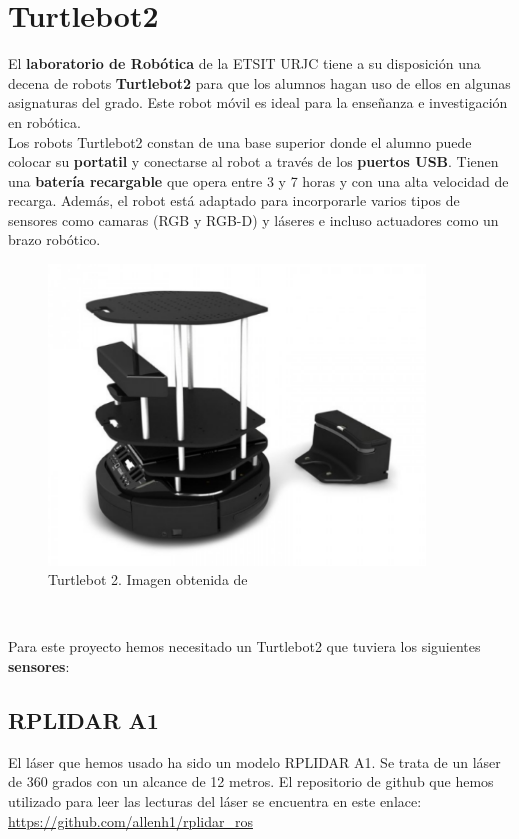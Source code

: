 \section{Turtlebot2}
\label{sec:turtlebot2}

El \textbf{laboratorio de Robótica} de la ETSIT URJC tiene a su disposición una decena de robots \textbf{Turtlebot2} para que los alumnos hagan uso de ellos en algunas asignaturas del grado. Este robot móvil es ideal para la enseñanza e investigación en robótica.\\

Los robots Turtlebot2 constan de una base superior donde el alumno puede colocar su \textbf{portatil} y conectarse al robot a través de los \textbf{puertos USB}. Tienen una \textbf{batería recargable} que opera entre 3 y 7 horas y con una alta velocidad de recarga. Además, el robot está adaptado para incorporarle varios tipos de sensores como camaras (RGB y RGB-D) y láseres e incluso actuadores como un brazo robótico.\\

\begin{figure} [H]
  \begin{center}
    \includegraphics[width=10cm]{imagenes/turtlebot2-real.png}
  \end{center}
  \caption[Turtlebot 2]{Turtlebot 2. Imagen obtenida de \cite{turtlebot2}}
  \label{fig:turtlebot2_real}
\end{figure}\

Para este proyecto hemos necesitado un Turtlebot2 que tuviera los siguientes \textbf{sensores}:
\subsection{RPLIDAR A1}
\label{subsec:rplidar_a1}
El láser que hemos usado ha sido un modelo RPLIDAR A1. Se trata de un láser de 360 grados con un alcance de 12 metros. El repositorio de github que hemos utilizado para leer las lecturas del láser se encuentra en este enlace: \url{https://github.com/allenh1/rplidar_ros}\\

